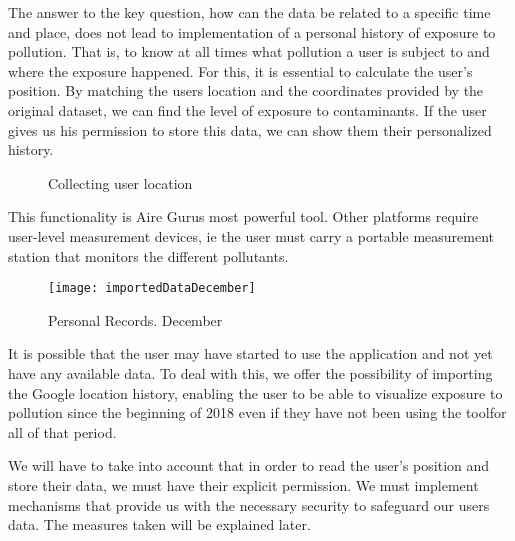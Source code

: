     The answer to the key question, how can the data be related to a specific time and place, does not lead to
    implementation of a personal history of exposure to pollution. That is, to know at all times what pollution
    a user is subject to and where the exposure happened.
    For this, it is essential to calculate the user's position. By matching the users location and the coordinates provided by the original dataset, we can find the level of exposure to contaminants.
    If the user gives us his permission to store this data, we can show them their personalized history.
    \begin{figure}[ht]
      \centering 
        \caption{Collecting user location}
      \end{figure}

      This functionality is Aire Gurus most powerful tool. Other platforms require user-level measurement devices, ie the user must carry
      a portable measurement station that monitors the different pollutants. \\
      \begin{figure}[ht]
         \centering
         \texttt{[image: importedDataDecember]}
         \caption{Personal Records. December}
     \end{figure}
     It is possible that the user may have started to use the application and not yet have any available data.
   To deal with this, we offer the possibility of importing the Google location history, enabling the user to be able to visualize
    exposure to pollution since the beginning of 2018 even if they have not been using the toolfor  all of that period.
     
     We will have to take into account that in order to read the user's position and store their data, we must
     have their explicit permission. We must implement mechanisms that provide us with the necessary security to safeguard our users data. The measures taken will be explained later.
     
